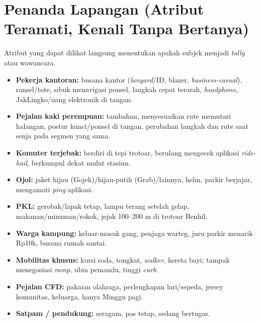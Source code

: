 \documentclass[11pt,a4paper]{report}
\begin{document}
\section{Penanda Lapangan (Atribut Teramati, Kenali Tanpa Bertanya)}
Atribut yang dapat dilihat langsung menentukan apakah subjek menjadi \emph{tally}
atau wawancara.
\begin{itemize}
  \item \textbf{Pekerja kantoran:} busana kantor (\emph{lanyard}/ID, blazer, \emph{business-casual}), ransel/tote, sibuk menavigasi ponsel, langkah cepat terarah, \emph{headphone}, JakLingko/uang elektronik di tangan.
  \item \textbf{Pejalan kaki perempuan:} tambahan, menyesuaikan rute memutari halangan, postur kunci/ponsel di tangan, perubahan langkah dan rute saat senja pada segmen yang sama.
  \item \textbf{Komuter terjebak:} berdiri di tepi trotoar, berulang mengecek aplikasi \emph{ride-hail}, berkumpul dekat mulut stasiun.
  \item \textbf{Ojol:} jaket hijau (Gojek)/hijau-putih (Grab)/lainnya, helm, parkir berjajar, mengamati \emph{ping} aplikasi.
  \item \textbf{PKL:} gerobak/lapak tetap, lampu terang setelah gelap, makanan/minuman/rokok, jejak 100--200 m di trotoar Benhil.
  \item \textbf{Warga kampung:} keluar-masuk gang, penjaga warteg, juru parkir menarik Rp10k, busana rumah santai.
  \item \textbf{Mobilitas khusus:} kursi roda, tongkat, \emph{walker}, kereta bayi; tampak menegosiasi \emph{ramp}, ubin pemandu, tinggi \emph{curb}.
  \item \textbf{Pejalan CFD:} pakaian olahraga, perlengkapan lari/sepeda, jersey komunitas, keluarga, hanya Minggu pagi.
  \item \textbf{Satpam / pendukung:} seragam, pos tetap, sedang bertugas.
\end{itemize}
\end{document}
